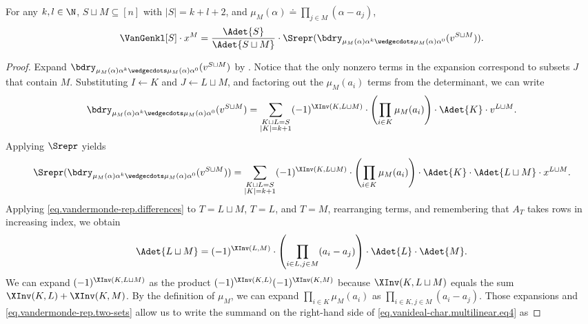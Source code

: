 \documentclass{toc}
\begin{document}
\begin{lemma}
  \label{lem.simplicial-vangen-high-degree}
  For any \(k,l \in \N\), \(S\sqcup M \subseteq [n]\) with $|S|=k+l+2$, and $\mu_M(\alpha) \doteq \prod_{j \in M}(\alpha - a_j)$, 
  \begin{equation} \label{eq.simplicial-vangen-high-degree}
    \VanGenkl[S]\cdot x^M = 
    \frac{\Adet{S}}{\Adet{S \sqcup M}} \cdot \Srepr(\bdry_{\mu_M(\alpha)\alpha^k\wedgecdots \mu_M(\alpha)\alpha^0}(v^{S \sqcup M})).
  \end{equation}
\end{lemma}

\begin{proof}
Expand $\bdry_{\mu_M(\alpha)\alpha^k\wedgecdots \mu_M(\alpha)\alpha^0} (v^{S \sqcup M})$ by . Notice that the only nonzero terms in the expansion correspond to subsets $J$ that contain $M$. Substituting $I \gets K$ and $J \gets L \sqcup M$, and factoring out the $\mu_M(a_i)$ terms from the determinant, we can write
%
\[ \bdry_{\mu_M(\alpha)\alpha^k\wedgecdots \mu_M(\alpha)\alpha^0}(v^{S \sqcup M}) = 
\sum_{\substack{K\sqcup L=S\\ |K|=k+1}} (-1)^{\XInv(K,L\sqcup M)} \cdot \left(\prod_{i\in K} \mu_M(a_{i})\right) \cdot \Adet{K} \cdot v^{L \sqcup M}. 
\]
Applying $\Srepr$ yields
\begin{equation}\label{eq.vanideal-char.multilinear.eq4}
\Srepr(\bdry_{\mu_M(\alpha)\alpha^k\wedgecdots \mu_M(\alpha)\alpha^0}(v^{S \sqcup M})) = 
\sum_{\substack{K\sqcup L=S\\ |K|=k+1}} (-1)^{\XInv(K,L\sqcup M)} \cdot \left(\prod_{i\in K} \mu_M(a_{i})\right) 
    \cdot \Adet{K} \cdot \Adet{L \sqcup M} \cdot x^{L \sqcup M}. 
\end{equation}
Applying \eqref{eq.vandermonde-rep.differences} to $T=L \sqcup M$, $T=L$, and $T=M$, rearranging terms, and remembering that $A_T$ takes rows in increasing index, we obtain
\begin{equation}
\label{eq.vandermonde-rep.two-sets}
\Adet{L \sqcup M} = (-1)^{\XInv(L,M)}\cdot \left( \prod_{i\in L,j\in M} (a_{i}-a_{j})\right) \cdot \Adet{L} \cdot \Adet{M}.
\end{equation}
We can expand $(-1)^{\XInv(K,L\sqcup M)}$ as the product $(-1)^{\XInv(K,L)} (-1)^{\XInv(K,M)}$ because
$\XInv(K,L \sqcup M)$ equals the sum $\XInv(K,L)+\XInv(K,M)$.
By the definition of $\mu_M$, we can expand $\prod_{i \in K} \mu_M(a_i)$ as $\prod_{i\in K, j \in M} (a_i-a_j)$. Those expansions and \eqref{eq.vandermonde-rep.two-sets} allow us to write the summand on the right-hand side of \eqref{eq.vanideal-char.multilinear.eq4} as

\end{proof}
\end{document}
